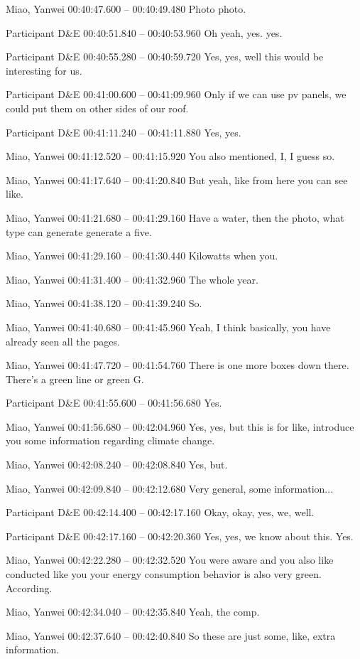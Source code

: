 {Miao, Yanwei 00:40:47.600 -- 00:40:49.480
Photo photo.

Participant D\&E 00:40:51.840 -- 00:40:53.960
Oh yeah, yes. yes.

Participant D\&E 00:40:55.280 -- 00:40:59.720
Yes, yes, well this would be interesting for us.

Participant D\&E 00:41:00.600 -- 00:41:09.960
Only if we can use pv panels, we could put them on other sides of our roof.

Participant D\&E 00:41:11.240 -- 00:41:11.880
Yes, yes.

Miao, Yanwei 00:41:12.520 -- 00:41:15.920
You also mentioned, I, I guess so.

Miao, Yanwei 00:41:17.640 -- 00:41:20.840
But yeah, like from here you can see like.

Miao, Yanwei 00:41:21.680 -- 00:41:29.160
Have a water, then the photo, what type can generate generate a five.

Miao, Yanwei 00:41:29.160 -- 00:41:30.440
Kilowatts when you.

Miao, Yanwei 00:41:31.400 -- 00:41:32.960
The whole year.

Miao, Yanwei 00:41:38.120 -- 00:41:39.240
So.

Miao, Yanwei 00:41:40.680 -- 00:41:45.960
Yeah, I think basically, you have already seen all the pages.

Miao, Yanwei 00:41:47.720 -- 00:41:54.760
There is one more boxes down there. There's a green line or green G.

Participant D\&E 00:41:55.600 -- 00:41:56.680
Yes.

Miao, Yanwei 00:41:56.680 -- 00:42:04.960
Yes, yes, but this is for like, introduce you some information regarding climate change.

Miao, Yanwei 00:42:08.240 -- 00:42:08.840
Yes, but.

Miao, Yanwei 00:42:09.840 -- 00:42:12.680
Very general, some information...

Participant D\&E 00:42:14.400 -- 00:42:17.160
Okay, okay, yes, we, well.

Participant D\&E 00:42:17.160 -- 00:42:20.360
Yes, yes, we know about this. Yes.

Miao, Yanwei 00:42:22.280 -- 00:42:32.520
You were aware and you also like conducted like you your energy consumption behavior is also very green. According.

Miao, Yanwei 00:42:34.040 -- 00:42:35.840
Yeah, the comp.

Miao, Yanwei 00:42:37.640 -- 00:42:40.840
So these are just some, like, extra information.

}
